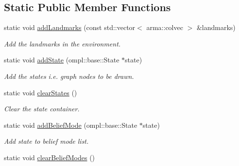 \subsection*{Static Public Member Functions}
\begin{DoxyCompactItemize}
\item 
\hypertarget{class_visualizer_af1d495ef8b48411cac724f242347b541}{static void \hyperlink{class_visualizer_af1d495ef8b48411cac724f242347b541}{add\-Landmarks} (const std\-::vector$<$ arma\-::colvec $>$ \&landmarks)}\label{class_visualizer_af1d495ef8b48411cac724f242347b541}

\begin{DoxyCompactList}\small\item\em Add the landmarks in the environment. \end{DoxyCompactList}\item 
\hypertarget{class_visualizer_a6c7ac8469193d405c73ed8d2edd5bc63}{static void \hyperlink{class_visualizer_a6c7ac8469193d405c73ed8d2edd5bc63}{add\-State} (ompl\-::base\-::\-State $\ast$state)}\label{class_visualizer_a6c7ac8469193d405c73ed8d2edd5bc63}

\begin{DoxyCompactList}\small\item\em Add the states i.\-e. graph nodes to be drawn. \end{DoxyCompactList}\item 
\hypertarget{class_visualizer_a05802a504ef9a4804af730d2848b9689}{static void \hyperlink{class_visualizer_a05802a504ef9a4804af730d2848b9689}{clear\-States} ()}\label{class_visualizer_a05802a504ef9a4804af730d2848b9689}

\begin{DoxyCompactList}\small\item\em Clear the state container. \end{DoxyCompactList}\item 
\hypertarget{class_visualizer_a19a65a5d08ade114252d809b78976b1f}{static void \hyperlink{class_visualizer_a19a65a5d08ade114252d809b78976b1f}{add\-Belief\-Mode} (ompl\-::base\-::\-State $\ast$state)}\label{class_visualizer_a19a65a5d08ade114252d809b78976b1f}

\begin{DoxyCompactList}\small\item\em Add state to belief mode list. \end{DoxyCompactList}\item 
\hypertarget{class_visualizer_a9bf180935f50440ed3ab68602f32f78a}{static void \hyperlink{class_visualizer_a9bf180935f50440ed3ab68602f32f78a}{clear\-Belief\-Modes} ()}\label{class_visualizer_a9bf180935f50440ed3ab68602f32f78a}


\end{DoxyCompactItemize}

